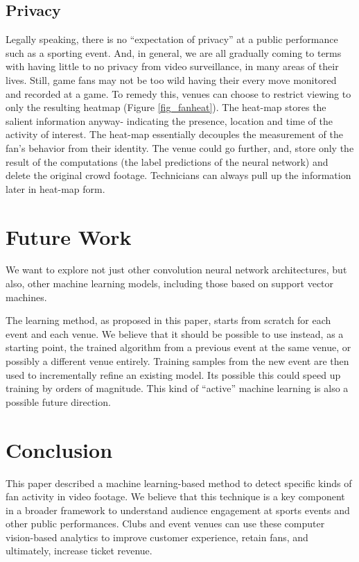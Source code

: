 \documentclass[times, 10pt,twocolumn]{article}
\begin{document}
\subsection{Privacy}
\label{sec_privacy}

Legally speaking, there is no ``expectation of privacy'' at a public performance such as a sporting event.   And, in general, we are all gradually coming to terms with having little to no privacy from video surveillance, in many areas of their lives.  Still, game fans may not be too wild having their every move monitored and recorded at a game.  To remedy this, venues can choose to restrict viewing to only the resulting heatmap (Figure \ref{fig_fanheat}).  The heat-map stores the salient information anyway- indicating the presence, location and time of the activity of interest.  The heat-map essentially decouples the measurement of the fan's behavior from their identity.  The venue could go further, and, store only the result of the computations (the label predictions of the neural network) and delete the original crowd footage.  Technicians can always pull up the information later in heat-map form.

\section{Future Work}

We want to explore not just other convolution neural network architectures, but also, other machine learning models, including those based on support vector machines.

The learning method, as proposed in this paper, starts from scratch for each event and each venue.  We believe that it should be possible to use instead, as a starting point, the trained algorithm from a previous event at the same venue, or possibly a different venue entirely.  Training samples from the new event are then used to incrementally refine an existing model.  Its possible this could speed up training by orders of magnitude.  This kind of ``active'' machine learning is also a possible future direction.

\section{Conclusion}

This paper described a machine learning-based method to detect specific kinds of fan activity in video footage.  We believe that this technique is a key component in a broader framework to understand audience engagement at sports events and other public performances.  Clubs and event venues can use these computer vision-based analytics to improve customer experience, retain fans, and ultimately, increase ticket revenue.
\end{document}
